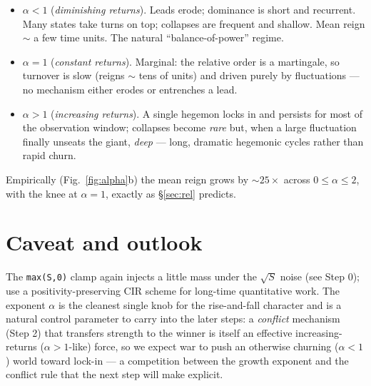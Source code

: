 \documentclass[11pt]{article}
\begin{document}
\begin{itemize}
\item $\alpha<1$ (\emph{diminishing returns}). Leads erode; dominance is short
  and recurrent. Many states take turns on top; collapses are frequent and
  shallow. Mean reign $\sim$ a few time units. The natural ``balance-of-power''
  regime.
\item $\alpha=1$ (\emph{constant returns}). Marginal: the relative order is a
  martingale, so turnover is slow (reigns $\sim$ tens of units) and driven purely
  by fluctuations — no mechanism either erodes or entrenches a lead.
\item $\alpha>1$ (\emph{increasing returns}). A single hegemon locks in and
  persists for most of the observation window; collapses become \emph{rare} but,
  when a large fluctuation finally unseats the giant, \emph{deep} — long, dramatic
  hegemonic cycles rather than rapid churn.
\end{itemize}
Empirically (Fig.~\ref{fig:alpha}b) the mean reign grows by $\sim\!25\times$ across
$0\le\alpha\le2$, with the knee at $\alpha=1$, exactly as \S\ref{sec:rel} predicts.

\section{Caveat and outlook}

The \texttt{max(S,0)} clamp again injects a little mass under the $\sqrt S$ noise
(see Step 0); use a positivity-preserving CIR scheme for long-time quantitative
work. The exponent $\alpha$ is the cleanest single knob for the rise-and-fall
character and is a natural control parameter to carry into the later steps: a
\emph{conflict} mechanism (Step 2) that transfers strength to the winner is itself
an effective increasing-returns ($\alpha>1$-like) force, so we expect war to push
an otherwise churning ($\alpha<1$) world toward lock-in --- a competition between
the growth exponent and the conflict rule that the next step will make explicit.
\end{document}
